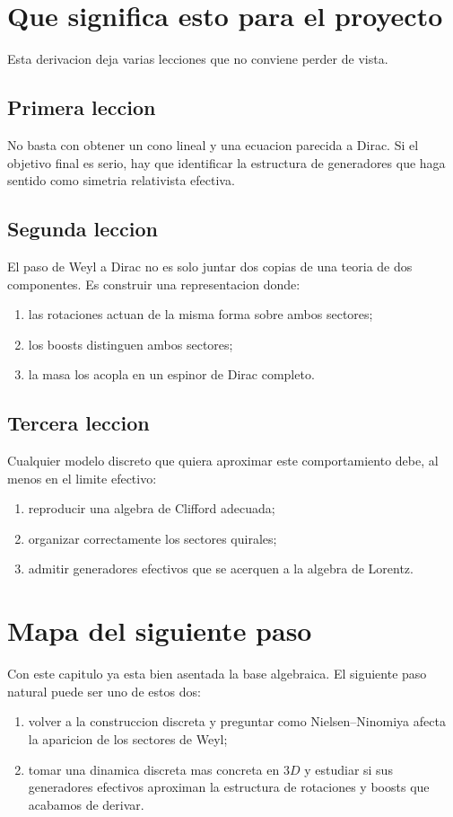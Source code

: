 \section{Que significa esto para el proyecto}
Esta derivacion deja varias lecciones que no conviene perder de vista.

\subsection{Primera leccion}
No basta con obtener un cono lineal y una ecuacion parecida a Dirac. Si el objetivo final es serio, hay que identificar la estructura de generadores que haga sentido como simetria relativista efectiva.

\subsection{Segunda leccion}
El paso de Weyl a Dirac no es solo juntar dos copias de una teoria de dos componentes. Es construir una representacion donde:
\begin{enumerate}[label=\arabic*.]
    \item las rotaciones actuan de la misma forma sobre ambos sectores;
    \item los boosts distinguen ambos sectores;
    \item la masa los acopla en un espinor de Dirac completo.
\end{enumerate}

\subsection{Tercera leccion}
Cualquier modelo discreto que quiera aproximar este comportamiento debe, al menos en el limite efectivo:
\begin{enumerate}[label=\arabic*.]
    \item reproducir una algebra de Clifford adecuada;
    \item organizar correctamente los sectores quirales;
    \item admitir generadores efectivos que se acerquen a la algebra de Lorentz.
\end{enumerate}

\section{Mapa del siguiente paso}
Con este capitulo ya esta bien asentada la base algebraica. El siguiente paso natural puede ser uno de estos dos:
\begin{enumerate}[label=\arabic*.]
    \item volver a la construccion discreta y preguntar como Nielsen--Ninomiya afecta la aparicion de los sectores de Weyl;
    \item tomar una dinamica discreta mas concreta en \(3D\) y estudiar si sus generadores efectivos aproximan la estructura de rotaciones y boosts que acabamos de derivar.
\end{enumerate}

